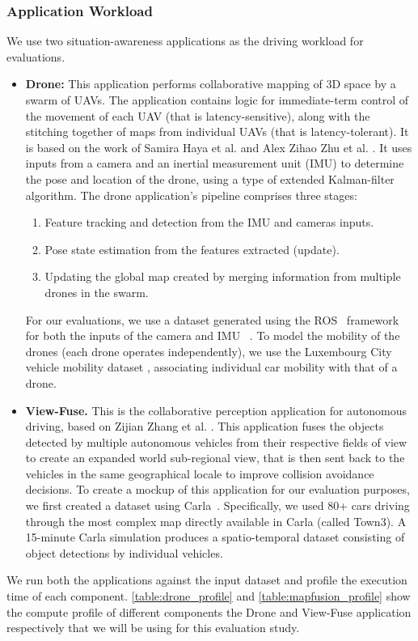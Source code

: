 \subsubsection{Application Workload}
We use two situation-awareness applications as the driving workload for evaluations. 
\begin{itemize}
\item \textbf{Drone: } This application performs collaborative mapping of 3D space by a swarm of UAVs. The application contains logic for immediate-term control of the movement of each UAV (that is latency-sensitive), along with the stitching together of maps from individual UAVs (that is latency-tolerant). It is based on the work of Samira Haya et al. \cite{dronenavi} and Alex Zihao Zhu et al. \cite{dronenavi1}. It uses inputs from a camera and an inertial measurement unit (IMU) to determine the pose and location of the drone, using a type of extended Kalman-filter algorithm. The drone application's pipeline comprises three stages: 
\begin{enumerate}
\item Feature tracking and detection from the IMU and cameras inputs.
\item Pose state estimation from the features extracted (update).
\item Updating the global map created by merging information from multiple drones in the swarm.
\end{enumerate}
For our evaluations, we use a dataset generated using the ROS~\cite{ros} framework for both the inputs of the camera and IMU ~\cite{dronedataset}. To model the mobility of the drones (each drone operates independently), we use the Luxembourg City vehicle mobility dataset \cite{lust}, associating individual car mobility with that of a drone. 

\item \textbf{View-Fuse.} This is the collaborative perception application for autonomous driving, based on Zijian Zhang et al. \cite{mapfusionimpl}. This application fuses the objects detected by multiple autonomous vehicles from their respective fields of view to create an expanded world sub-regional view, that is then sent back to the vehicles in the same geographical locale to improve collision avoidance decisions. To create a mockup of this application for our evaluation purposes, we first created a dataset using Carla~\cite{carlasim}. Specifically, we used 80+ cars driving through the most complex map directly available in Carla (called Town3). A 15-minute Carla simulation produces a spatio-temporal dataset consisting of object detections by individual vehicles. 
\end{itemize}
We run both the applications against the input dataset and profile the execution time of each component. \cref{table:drone_profile} and \cref{table:mapfusion_profile} show the compute profile of different components the Drone and View-Fuse application respectively that we will be using for this evaluation study.


